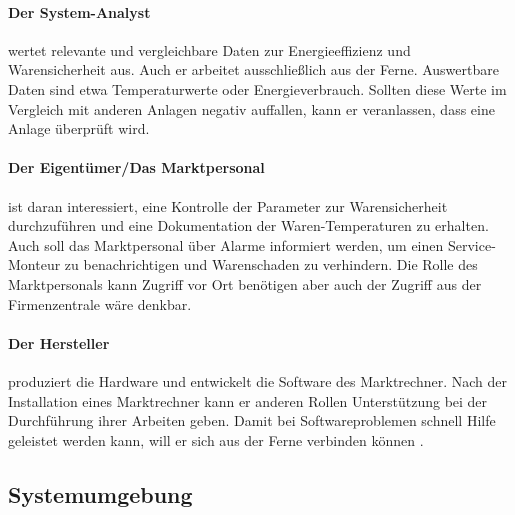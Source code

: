 \documentclass[11pt,a4paper]{report}
\begin{document}
\paragraph{Der System-Analyst} wertet relevante und vergleichbare Daten zur Energieeffizienz und Warensicherheit aus. Auch er arbeitet ausschließlich aus der Ferne. Auswertbare Daten sind etwa Temperaturwerte oder Energieverbrauch. Sollten diese Werte im Vergleich mit anderen Anlagen negativ auffallen, kann er veranlassen, dass eine Anlage überprüft wird.

\paragraph{Der Eigentümer/Das Marktpersonal} ist daran interessiert, eine Kontrolle der Parameter zur Warensicherheit durchzuführen und eine Dokumentation der Waren-Temperaturen zu erhalten. Auch soll das Marktpersonal über Alarme informiert werden, um einen Service-Monteur zu benachrichtigen und Warenschaden zu verhindern. Die Rolle des Marktpersonals kann Zugriff vor Ort benötigen aber auch der Zugriff aus der Firmenzentrale wäre denkbar.

\paragraph{Der Hersteller} produziert die Hardware und entwickelt die Software des Marktrechner. Nach der Installation eines Marktrechner kann er anderen Rollen Unterstützung bei der Durchführung ihrer Arbeiten geben. Damit bei Softwareproblemen schnell Hilfe geleistet werden kann, will er sich aus der Ferne verbinden können	. 

\subsection{Systemumgebung}
\end{document}
